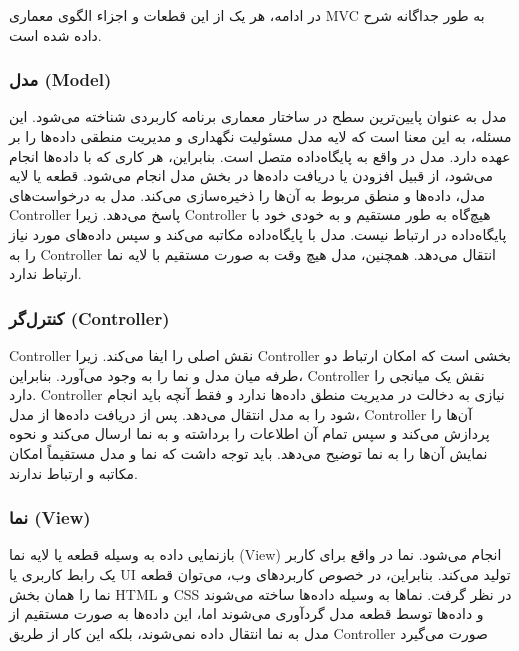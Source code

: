 در ادامه، هر یک از این قطعات و اجزاء الگوی معماری MVC به طور جداگانه شرح داده شده است.

\subsubsection{مدل (Model)}
مدل به عنوان پایین‌ترین سطح در ساختار معماری برنامه کاربردی شناخته می‌شود. این مسئله، به این معنا است که لایه مدل مسئولیت نگهداری و مدیریت منطقی داده‌ها را بر عهده دارد. مدل در واقع به پایگاه‌داده متصل است. بنابراین، هر کاری که با داده‌ها انجام می‌شود، از قبیل افزودن یا دریافت داده‌ها در بخش مدل انجام می‌شود. قطعه یا لایه مدل، داده‌ها و منطق مربوط به آن‌ها را ذخیره‌سازی می‌کند. مدل به درخواست‌های Controller‌ پاسخ می‌دهد. زیرا Controller‌ هیچ‌گاه به طور مستقیم و به خودی خود با پایگاه‌داده در ارتباط نیست. مدل با پایگاه‌داده مکاتبه می‌کند و سپس داده‌های مورد نیاز را به Controller انتقال می‌دهد. همچنین، مدل هیچ وقت به صورت مستقیم با لایه نما ارتباط ندارد.

\subsubsection{کنترل‌گر (Controller)}
Controller نقش اصلی را ایفا می‌کند. زیرا Controller بخشی است که امکان ارتباط دو طرفه میان مدل و نما را به وجود می‌آورد. بنابراین، Controller نقش یک میانجی را دارد. Controller نیازی به دخالت در مدیریت منطق داده‌ها ندارد و فقط آنچه باید انجام شود را به مدل انتقال می‌دهد. پس از دریافت داده‌ها از مدل، Controller‌ آن‌ها را پردازش می‌کند و سپس تمام آن اطلاعات را برداشته و به نما ارسال می‌کند و نحوه نمایش آن‌ها را به نما توضیح می‌دهد. باید توجه داشت که نما و مدل مستقیماً امکان مکاتبه و ارتباط ندارند.

\subsubsection{نما (View)}
بازنمایی داده به وسیله قطعه یا لایه نما (View) انجام می‌شود. نما در واقع برای کاربر یک رابط کاربری یا UI تولید می‌کند. بنابراین، در خصوص کاربردهای وب، می‌توان قطعه نما را همان بخش HTML و CSS در نظر گرفت. نماها به وسیله داده‌ها ساخته می‌شوند و داده‌ها توسط قطعه مدل گردآوری می‌شوند اما، این داده‌ها به صورت مستقیم از مدل به نما انتقال داده نمی‌شوند، بلکه این کار از طریق Controller صورت می‌گیرد

